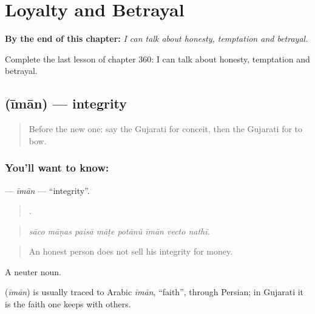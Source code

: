 
\chapter{Loyalty and Betrayal}
\label{ch:gu-loyalty-and-betrayal}

\begin{chapteropening}
\textbf{By the end of this chapter:} \emph{I can talk about honesty, temptation and betrayal.}

Complete the last lesson of chapter 360: I can talk about honesty, temptation and betrayal.
\end{chapteropening}

\section[\texorpdfstring{\gu{ઈમાન} (īmān)}{ઈમાન (īmān)}]{ (īmān) — integrity}

\label{lesson:GU-C360-iman}



\begin{quote}
Before the new one: say the Gujarati for conceit, then the Gujarati for to bow.
\end{quote}

\subsection*{You'll want to know: }
\textbf{} — \emph{īmān} — \textquotedblleft{}integrity\textquotedblright{}.

\begin{quote}
       .
\end{quote}

\begin{quote}
\emph{sāco māṇas paisā māṭe potānũ īmān vecto nathī.}
\end{quote}

\begin{quote}
An honest person does not sell his integrity for money.
\end{quote}

A neuter noun.

\begin{cousinweb}
\textbf{} (\emph{īmān}) is usually traced to Arabic \emph{īmān}, \textquotedblleft{}faith\textquotedblright{}, through Persian; in Gujarati it is the faith one keeps with others.
\end{cousinweb}


